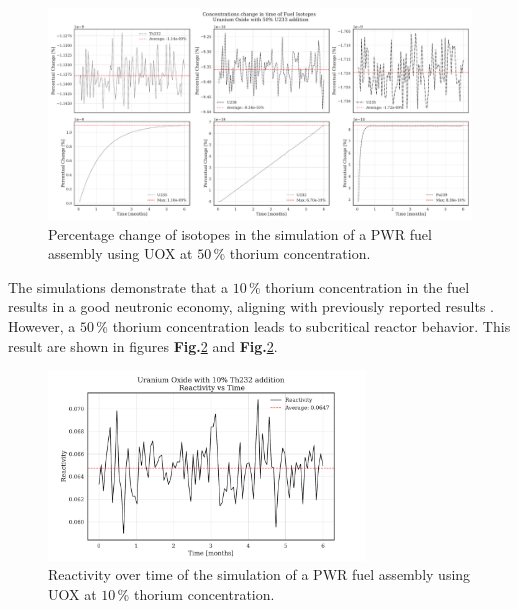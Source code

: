 \begin{figure}[h]
    \centering
    \includegraphics[width=1\textwidth]{Kap7/Figures_Kap7/percentual_change_th232_con_50.pdf}
    \caption{Percentage change of isotopes in the simulation of a PWR fuel assembly using UOX at \(50 \, \%\) thorium concentration.}
    \label{fig:th50}
\end{figure}

The simulations demonstrate that a \(10 \, \%\) thorium concentration in the fuel results in a good neutronic economy, aligning with previously reported results \cite{N_Improvement}. However, a \(50 \, \%\) thorium concentration leads to subcritical reactor behavior. This result are shown in figures \textbf{Fig.}\ref{fig:p_10} and \textbf{Fig.}\ref{fig:p_10}.

\begin{figure}[h]
    \centering
    \includegraphics[width=0.75\textwidth, scale = 0.5]{Kap7/Figures_Kap7/Reactivity_vs_Time_UOX_10.pdf}
    \caption{Reactivity over time of the simulation of a PWR fuel assembly using UOX at \(10 \, \%\) thorium concentration.}
    \label{fig:p_10}
\end{figure}

